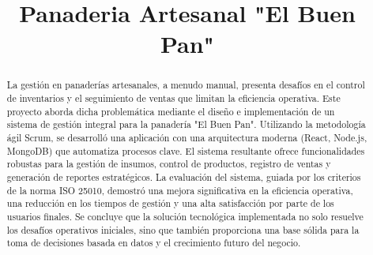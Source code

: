 \documentclass[conference]{IEEEtran}
\begin{document}
\title{Panaderia Artesanal "El Buen Pan"}

\author{
\and
{}
\and
{}
\and
{}
}

\maketitle

\begin{abstract}
La gestión en panaderías artesanales, a menudo manual, presenta desafíos en el control de inventarios y el seguimiento de ventas que limitan la eficiencia operativa. Este proyecto aborda dicha problemática mediante el diseño e implementación de un sistema de gestión integral para la panadería "El Buen Pan". Utilizando la metodología ágil Scrum, se desarrolló una aplicación con una arquitectura moderna (React, Node.js, MongoDB) que automatiza procesos clave. El sistema resultante ofrece funcionalidades robustas para la gestión de insumos, control de productos, registro de ventas y generación de reportes estratégicos. La evaluación del sistema, guiada por los criterios de la norma ISO 25010, demostró una mejora significativa en la eficiencia operativa, una reducción en los tiempos de gestión y una alta satisfacción por parte de los usuarios finales. Se concluye que la solución tecnológica implementada no solo resuelve los desafíos operativos iniciales, sino que también proporciona una base sólida para la toma de decisiones basada en datos y el crecimiento futuro del negocio.
\end{abstract}
\end{document}
